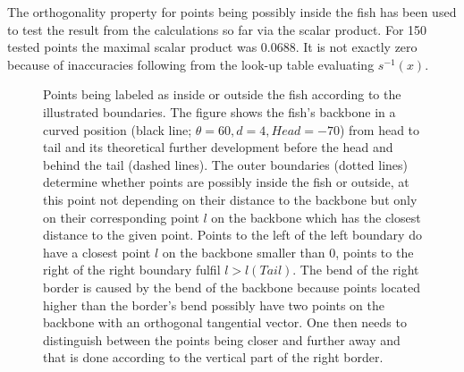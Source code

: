 The orthogonality property for points being possibly inside the fish has been used to test the result from the calculations so far via the scalar product. For 150 tested points the maximal scalar product was 0.0688. It is not exactly zero because of inaccuracies following from the look-up table evaluating $s^{-1}(x)$.

\begin{figure}
    \centering
    
    \caption{Points being labeled as inside or outside the fish according to the illustrated boundaries. The figure shows the fish's backbone in a curved position (black line; $\theta = 60, d = 4, Head = -70$) from head to tail and its theoretical further development before the head and behind the tail (dashed lines). The outer boundaries (dotted lines) determine whether points are possibly inside the fish or outside, at this point not depending on their distance to the backbone but only on their corresponding point $l$ on the backbone which has the closest distance to the given point. Points to the left of the left boundary do have a closest point $l$ on the backbone smaller than $0$, points to the right of the right boundary fulfil $l>l(Tail)$. The bend of the right border is caused by the bend of the backbone because points located higher than the border's bend possibly have two points on the backbone with an orthogonal tangential vector. One then needs to distinguish between the points being closer and further away and that is done according to the vertical part of the right border.}
    \label{fig:borders}
\end{figure}


